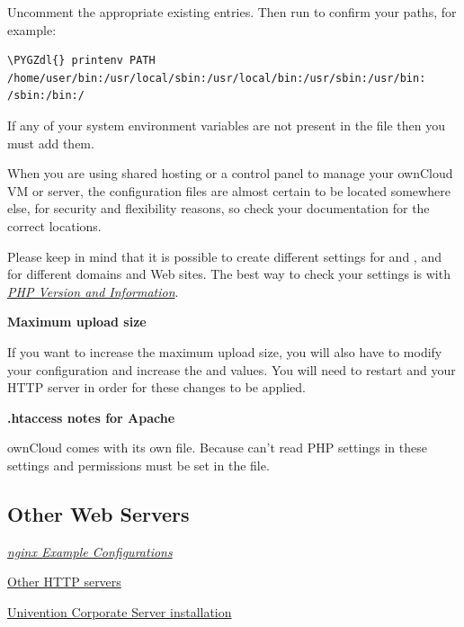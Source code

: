 \documentclass[letterpaper,10pt,english]{sphinxmanual}
\def\PYGZdl{\char`\$}
\begin{document}
Uncomment the appropriate existing entries. Then run  to
confirm your paths, for example:

\begin{Verbatim}[commandchars=\\\{\}]
\PYGZdl{} printenv PATH
/home/user/bin:/usr/local/sbin:/usr/local/bin:/usr/sbin:/usr/bin:
/sbin:/bin:/
\end{Verbatim}

If any of your system environment variables are not present in the file then
you must add them.

When you are using shared hosting or a control panel to manage your ownCloud VM
or server, the configuration files are almost certain to be located somewhere
else, for security and flexibility reasons, so check your documentation for the
correct locations.

Please keep in mind that it is possible to create different settings for
 and , and for different domains and Web sites.
The best way to check your settings is with {\hyperref[issues/general_troubleshooting:label-phpinfo]{\emph{PHP Version and Information}}}.

\textbf{Maximum upload size}

If you want to increase the maximum upload size, you will also have to modify
your  configuration and increase the  and
 values. You will need to restart  and your HTTP
server in order for these changes to be applied.

\textbf{.htaccess notes for Apache}

ownCloud comes with its own  file. Because  can't
read PHP settings in  these settings and permissions must be set
in the  file.


\subsection{Other Web Servers}
\label{installation/source_installation:other-http-servers-label}\label{installation/source_installation:other-web-servers}
{\hyperref[installation/nginx_examples::doc]{\emph{nginx Example Configurations}}}

\href{https://github.com/owncloud/documentation/wiki/Alternate-Web-server-notes}{Other HTTP servers}

\href{https://github.com/owncloud/documentation/wiki/UCS-Installation}{Univention Corporate Server installation}
\end{document}
